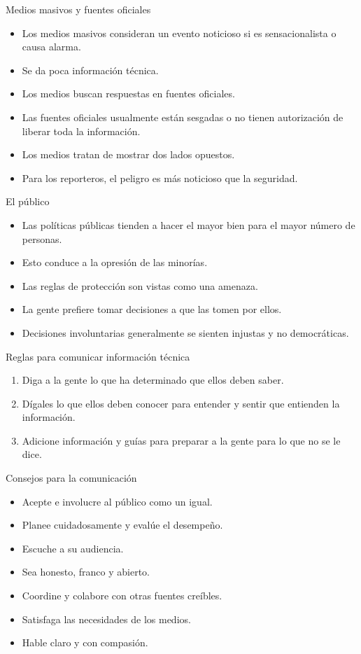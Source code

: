 \documentclass[10pt,compress]{beamer}
\begin{document}
\begin{frame}{Medios masivos y fuentes oficiales}
\begin{itemize}
\item Los medios masivos consideran un evento noticioso si es sensacionalista o causa alarma.
\item Se da poca información técnica.
\item Los medios buscan respuestas en fuentes oficiales.
\item Las fuentes oficiales usualmente están sesgadas o no tienen autorización de liberar toda la información.
\item Los medios tratan de mostrar dos lados opuestos.
\item Para los reporteros, el peligro es más noticioso que la seguridad.
\end{itemize}
\end{frame}

\begin{frame}{El público}
\begin{itemize}
\item Las políticas públicas tienden a hacer el mayor bien para el mayor número de personas.
\item Esto conduce a la opresión de las minorías.
\item Las reglas de protección son vistas como una amenaza.
\item La gente prefiere tomar decisiones a que las tomen por ellos.
\item Decisiones involuntarias generalmente se sienten injustas y no democráticas.
\end{itemize}
\end{frame}

\begin{frame}{Reglas para comunicar información técnica}
\begin{enumerate}
\item Diga a la gente lo que ha determinado que ellos deben saber.
\item Dígales lo que ellos deben conocer para entender y sentir que entienden la información.
\item Adicione información y guías para preparar a la gente para lo que no se le dice.
\end{enumerate}
\end{frame}

\begin{frame}{Consejos para la comunicación}
\begin{itemize}
\item Acepte e involucre al público como un igual.
\item Planee cuidadosamente y evalúe el desempeño.
\item Escuche a su audiencia.
\item Sea honesto, franco y abierto.
\item Coordine y colabore con otras fuentes creíbles.
\item Satisfaga las necesidades de los medios.
\item Hable claro y con compasión.
\end{itemize}
\end{frame}
\end{document}
